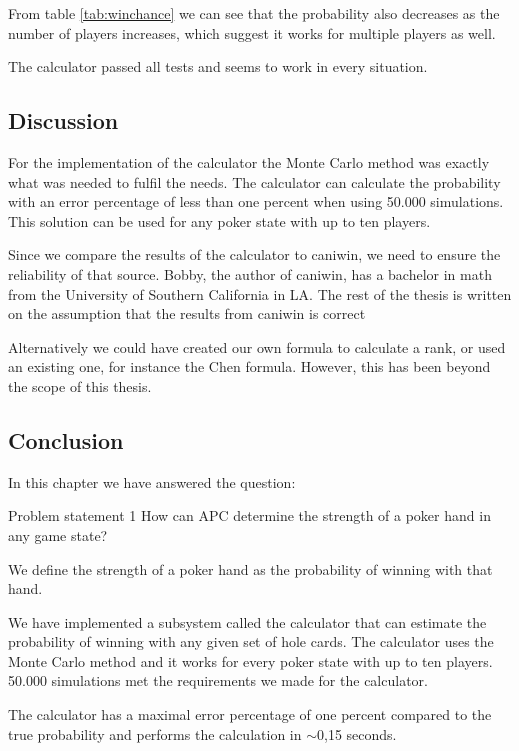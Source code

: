 From table \ref{tab:winchance} we can see that the probability also decreases as the number of players increases, which suggest it works for multiple players as well.

The calculator passed all tests and seems to work in every situation. 

\subsection{Discussion}
For the implementation of the calculator the Monte Carlo method was exactly what was needed to fulfil the needs. The calculator can calculate the probability with an error percentage of less than one percent when using 50.000 simulations. This solution can be used for any poker state with up to ten players.	

Since we compare the results of the calculator to caniwin, we need to ensure the reliability of that source. Bobby, the author of caniwin, has a bachelor in math from the University of Southern California in LA. The rest of the thesis is written on the assumption that the results from caniwin is correct

Alternatively we could have created our own formula to calculate a rank, or used an existing one, for instance the Chen formula. However, this has been beyond the scope of this thesis.

\subsection{Conclusion}
In this chapter we have answered the question:
\vspace{4mm}
\begin{statementBox2}{Problem statement 1}
How can APC determine the strength of a poker hand in any game state?
\end{statementBox2}
\vspace{4mm}

We define the strength of a poker hand as the probability of winning with that hand.

We have implemented a subsystem called the calculator that can estimate the probability of winning with any given set of hole cards. The calculator uses the Monte Carlo method and it works for every poker state with up to ten players. 50.000 simulations  met the requirements we made for the calculator.   

The calculator has a maximal error percentage of one percent compared to the true probability and performs the calculation in $\sim$0,15 seconds.
